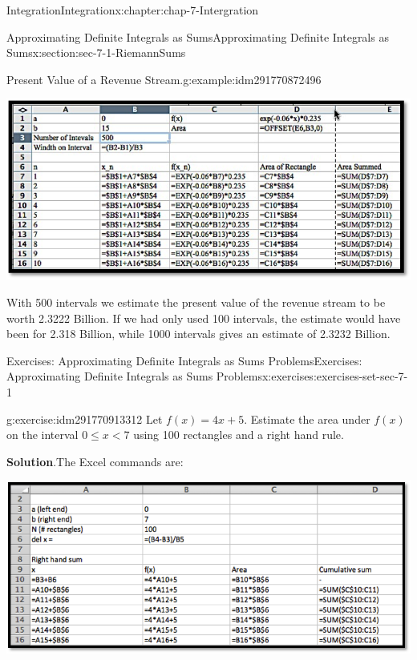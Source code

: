 \documentclass[oneside,10pt,]{book}
\numberwithin{equation}{section}
\newcommand{\lt}{<}
\begin{document}
\begin{chapterptx}{Integration}{}{Integration}{}{}{x:chapter:chap-7-Intergration}
\begin{sectionptx}{Approximating Definite Integrals as Sums}{}{Approximating Definite Integrals as Sums}{}{}{x:section:sec-7-1-RiemannSums}
\begin{example}{Present Value of a Revenue Stream.}{g:example:idm291770872496}
\begin{sidebyside}{1}{0.1}{0.1}{0}
\begin{sbspanel}{0.8}
\includegraphics[width=\linewidth]{images/sec7-1-12.png}
\end{sbspanel}%
\end{sidebyside}%
\par
With 500 intervals we estimate the present value of the revenue stream to be worth \textdollar{}2.3222 Billion.  If we had only used 100 intervals, the estimate would have been for \textdollar{}2.318 Billion, while 1000 intervals gives an estimate of \textdollar{}2.3232 Billion.%
\end{example}
%
%
\typeout{************************************************}
\typeout{************************************************}
%
\begin{exercises-subsection}{Exercises: Approximating Definite Integrals as Sums Problems}{}{Exercises: Approximating Definite Integrals as Sums Problems}{}{}{x:exercises:exercises-set-sec-7-1}
\begin{divisionexercise}{1}{}{}{g:exercise:idm291770913312}%
Let \(f(x) = 4 x + 5\).  Estimate the area under \(f(x)\) on the interval \(0 \le  x \lt 7\) using 100 rectangles and a right hand rule.%
\par\smallskip%
\noindent\textbf{Solution}.\hypertarget{g:solution:idm291770916336}{}\quad{}The Excel commands are:%
\begin{sidebyside}{1}{0}{0}{0}%
\begin{sbspanel}{1}%
\includegraphics[width=\linewidth]{images/sec7-1-sol1a.png}

\end{sbspanel}
\end{sidebyside}
\end{divisionexercise}
\end{exercises-subsection}
\end{sectionptx}
\end{chapterptx}
\end{document}
